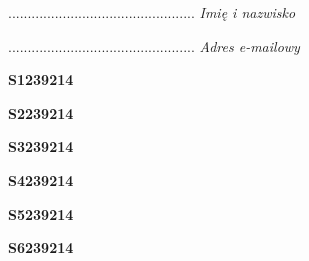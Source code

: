 \begin{turn}{90}\begin{minipage}{\linewidth} \vspace{20mm} ................................................  \textit{Imię i nazwisko}\end{minipage}\end{turn}

\begin{turn}{90}\begin{minipage}{\linewidth} \vspace{20mm} ................................................  \textit{Adres e-mailowy}\end{minipage}\end{turn}

\begin{turn}{90}\huge \begin{minipage}{\linewidth} \vspace{10mm}\textbf{S1239214}\end{minipage}\end{turn}

\begin{turn}{90}\huge \begin{minipage}{\linewidth} \vspace{10mm}\textbf{S2239214}\end{minipage}\end{turn}

\begin{turn}{90}\huge \begin{minipage}{\linewidth} \vspace{10mm}\textbf{S3239214}\end{minipage}\end{turn}

\begin{turn}{90}\huge \begin{minipage}{\linewidth} \vspace{10mm}\textbf{S4239214}\end{minipage}\end{turn}

\begin{turn}{90}\huge \begin{minipage}{\linewidth} \vspace{10mm}\textbf{S5239214}\end{minipage}\end{turn}

\begin{turn}{90}\huge \begin{minipage}{\linewidth} \vspace{10mm}\textbf{S6239214}\end{minipage}\end{turn}

